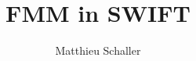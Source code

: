 \documentclass[fleqn, usenatbib, useAMS, a4paper]{mnras}
\title{FMM in SWIFT}
\author{Matthieu Schaller}
\begin{document}
\maketitle









\appendix
\onecolumn

\end{document}
